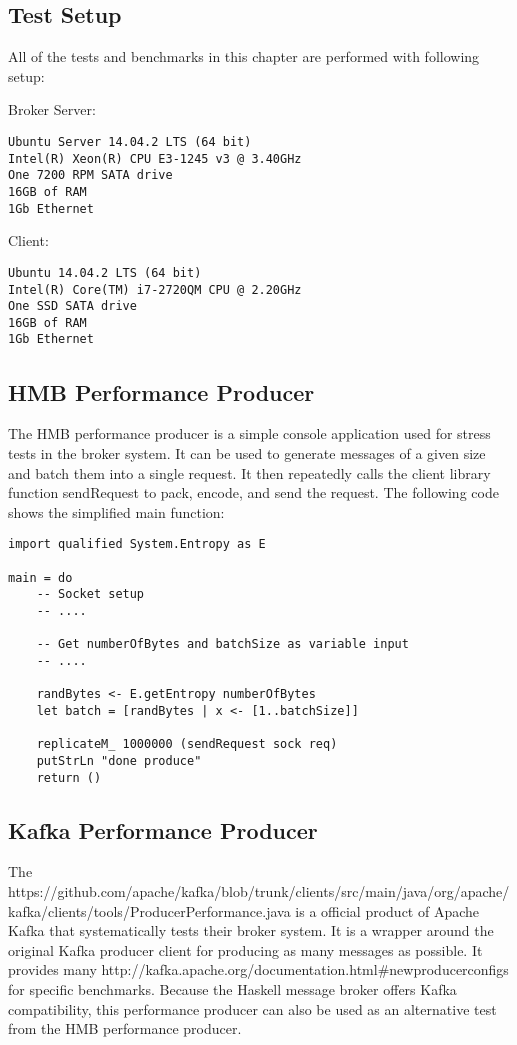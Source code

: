 \subsection{Test Setup}

All of the tests and benchmarks in this chapter are performed with following setup:

Broker Server:
\begin{verbatim}
Ubuntu Server 14.04.2 LTS (64 bit)
Intel(R) Xeon(R) CPU E3-1245 v3 @ 3.40GHz
One 7200 RPM SATA drive
16GB of RAM
1Gb Ethernet
\end{verbatim}

Client:
\begin{verbatim}
Ubuntu 14.04.2 LTS (64 bit)
Intel(R) Core(TM) i7-2720QM CPU @ 2.20GHz
One SSD SATA drive
16GB of RAM
1Gb Ethernet
\end{verbatim}

\subsection{HMB Performance Producer}
\label{conc-eval-hmbperformanceprod}

The HMB performance producer is a simple console application used for stress
tests in the broker system. It can be used to generate messages of a given size
and batch them into a single request. It then repeatedly calls the client
library function sendRequest to pack, encode, and send the request. The following
code shows the simplified main function:

\begin{lstlisting}
import qualified System.Entropy as E

main = do 
    -- Socket setup 
    -- ....

    -- Get numberOfBytes and batchSize as variable input 
    -- ....

    randBytes <- E.getEntropy numberOfBytes 
    let batch = [randBytes | x <- [1..batchSize]]

    replicateM_ 1000000 (sendRequest sock req) 
    putStrLn "done produce"
    return ()

\end{lstlisting}

\subsection{Kafka Performance Producer}
\label{conc-eval-kafkaperformanceprod}

The 
{https://github.com/apache/kafka/blob/trunk/clients/src/main/java/org/apache/kafka/clients/tools/ProducerPerformance.java}
is a official product of Apache Kafka that systematically tests their broker
system. It is a wrapper around the original Kafka producer client for producing
as many messages as possible. It provides many 
{http://kafka.apache.org/documentation.html\#newproducerconfigs} for specific
benchmarks. Because the Haskell message broker offers Kafka compatibility, this
performance producer can also be used as an alternative test from the HMB performance
producer.

